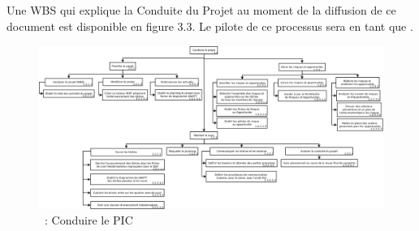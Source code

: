 \subsection{\WBSCourt{}}
\label{ProcessusConduirePic}
Une WBS qui explique la Conduite du Projet au moment de la diffusion de ce document est disponible en figure 3.3.
Le pilote de ce processus sera \Sergi{} en tant que \CP{}.
\newpage
\begin{figure}[H]
\centering
 \includegraphics[width=24cm,angle=90]{images/ConduireLeProjet.png}
 \caption{\WBSCourt{}~: Conduire le PIC}
 \label{WBS3}
\end{figure}


